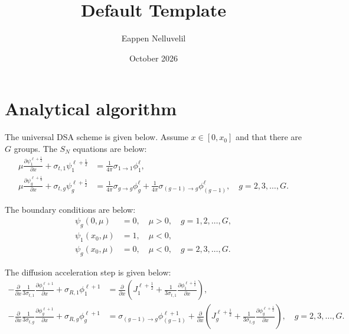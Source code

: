 \documentclass{article}
\title{Default Template}
\author{Eappen Nelluvelil}
\date{October 2026}
\newcommand{\parens}[1]{\left( #1 \right)}
\newcommand{\brackets}[1]{\left[ #1 \right]}
\begin{document}
\maketitle

\section{Analytical algorithm}

The universal DSA scheme is given below.
Assume $x \in \brackets{0, x_{0}}$ and that there are $G$ groups.
The $S_{N}$ equations are below:
\begin{align}
  \mu \frac{\partial \psi_{1}^{\ell+\frac{1}{2}}}{\partial x} + \sigma_{t, 1} \psi_{1}^{\ell+\frac{1}{2}} & = \frac{1}{4\pi} \sigma_{1 \rightarrow 1} \phi_{1}^{\ell},                                                                                                                \\
  \mu \frac{\partial \psi_{g}^{\ell+\frac{1}{2}}}{\partial x} + \sigma_{t, g} \psi_{g}^{\ell+\frac{1}{2}} & = \frac{1}{4 \pi} \sigma_{g \rightarrow g} \phi_{g}^{\ell} + \frac{1}{4 \pi} \sigma_{\parens{g - 1} \rightarrow g} \phi_{\parens{g-1}}^{\ell}, \quad g = 2, 3, \ldots, G.
\end{align}

The boundary conditions are below:
\begin{align}
  \psi_{g} \parens{0, \mu}     & = 0, \quad \mu > 0, \quad g = 1, 2, \ldots, G, \\
  \psi_{1} \parens{x_{0}, \mu} & = 1, \quad \mu < 0,                            \\
  \psi_{g} \parens{x_{0}, \mu} & = 0, \quad \mu < 0, \quad g = 2, 3, \ldots, G.
\end{align}

The diffusion acceleration step is given below:
\begin{align}
  -\frac{\partial}{\partial x} \frac{1}{3 \sigma_{t, 1}} \frac{\partial \phi_{1}^{\ell+1}}{\partial x} + \sigma_{R, 1} \phi_{1}^{\ell+1} & = \frac{\partial}{\partial x} \parens{J_{1}^{\ell + \frac{1}{2}} + \frac{1}{3 \sigma_{t, 1}} \frac{\partial \phi_{1}^{\ell + \frac{1}{2}}}{\partial x}},                                                                                                 \\
  -\frac{\partial}{\partial x} \frac{1}{3 \sigma_{t, g}} \frac{\partial \phi_{g}^{\ell+1}}{\partial x} + \sigma_{R, g} \phi_{g}^{\ell+1} & = \sigma_{\parens{g - 1} \rightarrow g} \phi_{\parens{g-1}}^{\ell+1} + \frac{\partial}{\partial x} \parens{J_{g}^{\ell + \frac{1}{2}} + \frac{1}{3 \sigma_{t, g}} \frac{\partial \phi_{g}^{\ell + \frac{1}{2}}}{\partial x}}, \quad g = 2, 3, \ldots, G.
\end{align}
\end{document}
